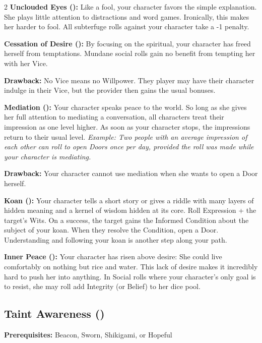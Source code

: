\begin{multicols}{2}
\textbf{Unclouded Eyes (\textbullet):} Like a fool, your character favors the simple explanation. She plays little attention to distractions and word games. Ironically, this makes her harder to fool. All subterfuge rolls against your character take a -1 penalty.

\textbf{Cessation of Desire (\textbullet\textbullet):} By focusing on the spiritual, your character has freed herself from temptations. Mundane social rolls gain no benefit from tempting her with her Vice.

\textbf{Drawback:} No Vice means no Willpower. They player may have their character indulge in their Vice, but the provider then gains the usual bonuses.

\textbf{Mediation (\textbullet\textbullet\textbullet):} Your character speaks peace to the world. So long as she gives her full attention to mediating a conversation, all characters treat their impression as one level higher. As soon as your character stops, the impressions return to their usual level. \textit{Example: Two people with an average impression of each other can roll to open Doors once per day, provided the roll was made while your character is mediating.}

\textbf{Drawback:} Your character cannot use mediation when she wants to open a Door herself.

\textbf{Koan (\textbullet\textbullet\textbullet\textbullet):} Your character tells a short story or gives a riddle with many layers of hidden meaning and a kernel of wisdom hidden at its core. Roll Expression + the target's Wits. On a success, the target gains the Informed Condition about the subject of your koan. When they resolve the Condition, open a Door. Understanding and following your koan is another step along your path.

\textbf{Inner Peace (\textbullet\textbullet\textbullet\textbullet\textbullet):} Your character has risen above desire: She could live comfortably on nothing but rice and water. This lack of desire makes it incredibly hard to push her into anything. In Social rolls where your character's only goal is to resist, she may roll add Integrity (or Belief) to her dice pool.

\subsection*{Taint Awareness (\textbullet\textbullet)}
\textbf{Prerequisites:} Beacon, Sworn, Shikigami, or Hopeful\\


\end{multicols}
